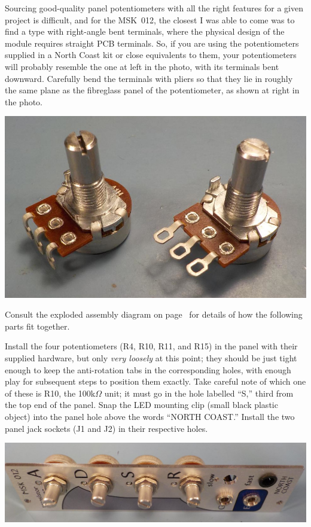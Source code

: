 Sourcing good-quality panel potentiometers with all the right features for a
given project is difficult, and for the MSK~012, the closest I was able to
come was to find a type with right-angle bent terminals, where the physical
design of the module requires straight PCB terminals.  So, if you are using
the potentiometers supplied in a North Coast kit or close equivalents to
them, your potentiometers will probably resemble the one at left in the
photo, with its terminals bent downward.  Carefully bend the terminals with
pliers so that they lie in roughly the same plane as the fibreglass panel of
the potentiometer, as shown at right in the photo.

\noindent\includegraphics[width=\linewidth]{bend-pots.jpg}

Consult the exploded assembly diagram on page~\pageref{fig:exploded} for
details of how the following parts fit together.

Install the four potentiometers (R4, R10, R11, and R15) in the panel with
their supplied hardware, but only \emph{very loosely} at this point; they
should be just tight enough to keep the anti-rotation tabs in the
corresponding holes, with enough play for subsequent steps to position them
exactly.  Take careful note of which one of these is R10, the 100k$\Omega$
unit; it must go in the hole labelled ``S,'' third from the top end of the
panel.  Snap the LED mounting clip (small black plastic object) into the
panel hole above the words ``NORTH COAST.'' Install the two panel jack
sockets (J1 and J2) in their respective holes.

\noindent\includegraphics[width=\linewidth]{panel-parts1.jpg}

